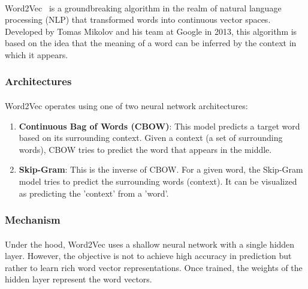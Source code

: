         \paragraph{}Word2Vec~\cite{mikolov_efficient_2013} is a groundbreaking algorithm in the realm of natural language processing (NLP) that transformed words into continuous vector spaces. Developed by Tomas Mikolov and his team at Google in 2013, this algorithm is based on the idea that the meaning of a word can be inferred by the context in which it appears.
        
        \subsubsection{Architectures}
        
            \paragraph{}Word2Vec operates using one of two neural network architectures:
            
            \begin{enumerate}
                \item \textbf{Continuous Bag of Words (CBOW)}: This model predicts a target word based on its surrounding context. Given a context (a set of surrounding words), CBOW tries to predict the word that appears in the middle.
                \item \textbf{Skip-Gram}: This is the inverse of CBOW. For a given word, the Skip-Gram model tries to predict the surrounding words (context). It can be visualized as predicting the 'context' from a 'word'.
            \end{enumerate}
        
        \subsubsection{Mechanism}
        
            \paragraph{}Under the hood, Word2Vec uses a shallow neural network with a single hidden layer. However, the objective is not to achieve high accuracy in prediction but rather to learn rich word vector representations. Once trained, the weights of the hidden layer represent the word vectors.
            
